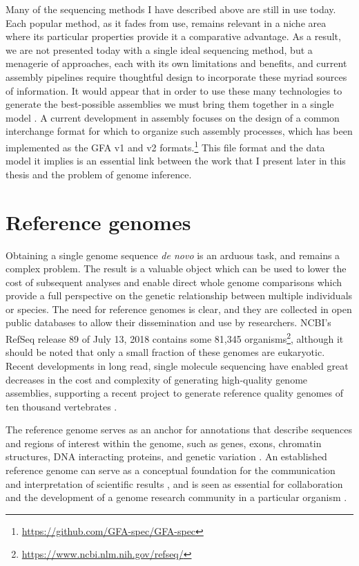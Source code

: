 Many of the sequencing methods I have described above are still in use today.
Each popular method, as it fades from use, remains relevant in a niche area where its particular properties provide it a comparative advantage.
As a result, we are not presented today with a single ideal sequencing method, but a menagerie of approaches, each with its own limitations and benefits, and current assembly pipelines require thoughtful design to incorporate these myriad sources of information.
It would appear that in order to use these many technologies to generate the best-possible assemblies we must bring them together in a single model \cite{chaisson2018multi}.
A current development in assembly focuses on the design of a common interchange format for which to organize such assembly processes, which has been implemented as the GFA v1 and v2 formats.\footnote{\url{https://github.com/GFA-spec/GFA-spec}}
This file format and the data model it implies is an essential link between the work that I present later in this thesis and the problem of genome inference.

\section{Reference genomes}

Obtaining a single genome sequence \emph{de novo} is an arduous task, and remains a complex problem.
The result is a valuable object which can be used to lower the cost of subsequent analyses and enable direct whole genome comparisons which provide a full perspective on the genetic relationship between multiple individuals or species.
The need for reference genomes is clear, and they are collected in open public databases to allow their dissemination and use by researchers.
NCBI's RefSeq release 89 of July 13, 2018 contains some 81,345 organisms\footnote{\url{https://www.ncbi.nlm.nih.gov/refseq/}}, although it should be noted that only a small fraction of these genomes are eukaryotic.
Recent developments in long read, single molecule sequencing have enabled great decreases in the cost and complexity of generating high-quality genome assemblies, supporting a recent project to generate reference quality genomes of ten thousand vertebrates \cite{genome2009genome,koepfli2015genome}.

The reference genome serves as an anchor for annotations that describe sequences and regions of interest within the genome, such as genes, exons, chromatin structures, DNA interacting proteins, and genetic variation \cite{sherry2001dbsnp,quinlan2010bedtools,encode2012integrated}.
An established reference genome can serve as a conceptual foundation for the communication and interpretation of scientific results \cite{kent2002human}, and is seen as essential for collaboration and the development of a genome research community in a particular organism \cite{smith1998functional,cherry1998sgd}.

